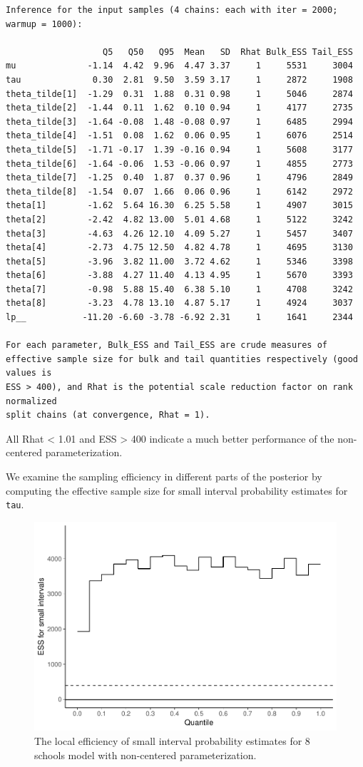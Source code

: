 \documentclass[american,]{article}
\begin{document}
\begin{verbatim}
Inference for the input samples (4 chains: each with iter = 2000; warmup = 1000):

                   Q5   Q50   Q95  Mean   SD  Rhat Bulk_ESS Tail_ESS
mu              -1.14  4.42  9.96  4.47 3.37     1     5531     3004
tau              0.30  2.81  9.50  3.59 3.17     1     2872     1908
theta_tilde[1]  -1.29  0.31  1.88  0.31 0.98     1     5046     2874
theta_tilde[2]  -1.44  0.11  1.62  0.10 0.94     1     4177     2735
theta_tilde[3]  -1.64 -0.08  1.48 -0.08 0.97     1     6485     2994
theta_tilde[4]  -1.51  0.08  1.62  0.06 0.95     1     6076     2514
theta_tilde[5]  -1.71 -0.17  1.39 -0.16 0.94     1     5608     3177
theta_tilde[6]  -1.64 -0.06  1.53 -0.06 0.97     1     4855     2773
theta_tilde[7]  -1.25  0.40  1.87  0.37 0.96     1     4796     2849
theta_tilde[8]  -1.54  0.07  1.66  0.06 0.96     1     6142     2972
theta[1]        -1.62  5.64 16.30  6.25 5.58     1     4907     3015
theta[2]        -2.42  4.82 13.00  5.01 4.68     1     5122     3242
theta[3]        -4.63  4.26 12.10  4.09 5.27     1     5457     3407
theta[4]        -2.73  4.75 12.50  4.82 4.78     1     4695     3130
theta[5]        -3.96  3.82 11.00  3.72 4.62     1     5346     3398
theta[6]        -3.88  4.27 11.40  4.13 4.95     1     5670     3393
theta[7]        -0.98  5.88 15.40  6.38 5.10     1     4708     3242
theta[8]        -3.23  4.78 13.10  4.87 5.17     1     4924     3037
lp__           -11.20 -6.60 -3.78 -6.92 2.31     1     1641     2344

For each parameter, Bulk_ESS and Tail_ESS are crude measures of 
effective sample size for bulk and tail quantities respectively (good values is 
ESS > 400), and Rhat is the potential scale reduction factor on rank normalized
split chains (at convergence, Rhat = 1).
\end{verbatim}

All Rhat \textless{} 1.01 and ESS \textgreater{} 400 indicate a much
better performance of the non-centered parameterization.

We examine the sampling efficiency in different parts of the posterior
by computing the effective sample size for small interval probability
estimates for \texttt{tau}.

\begin{figure}[t]
  \centering
  \includegraphics[width=0.6\linewidth]{graphics/local-ess-fit-ncp2-1.pdf}
  \caption{The local efficiency of small interval probability estimates for 8 schools model with non-centered parameterization.}
\end{figure}
\end{document}
